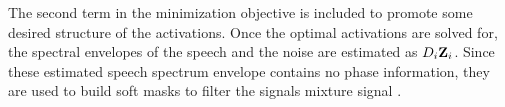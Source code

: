 %
The second term in the minimization objective is included to promote some desired structure of the activations. 
Once the optimal activations are solved for, the spectral envelopes of the speech and the noise are 
estimated as $ {D}_{i} \bm{\mathrm{Z}}_{i}$. Since these estimated speech spectrum envelope contains no phase information, 
they are used to build soft masks to filter the signals mixture signal \cite{schmidt07mlsp}.


%
%
